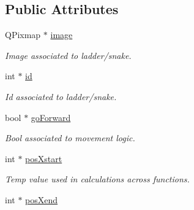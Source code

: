 \subsection*{Public Attributes}
\begin{DoxyCompactItemize}
\item 
\hypertarget{classgamescene__1__ladderSnake_a9f6d4f80e42294baf24e9f75595f2f36}{Q\-Pixmap $\ast$ \hyperlink{classgamescene__1__ladderSnake_a9f6d4f80e42294baf24e9f75595f2f36}{image}}\label{classgamescene__1__ladderSnake_a9f6d4f80e42294baf24e9f75595f2f36}

\begin{DoxyCompactList}\small\item\em Image associated to ladder/snake. \end{DoxyCompactList}\item 
\hypertarget{classgamescene__1__ladderSnake_a84c434594befd54905917da864b842f5}{int $\ast$ \hyperlink{classgamescene__1__ladderSnake_a84c434594befd54905917da864b842f5}{id}}\label{classgamescene__1__ladderSnake_a84c434594befd54905917da864b842f5}

\begin{DoxyCompactList}\small\item\em Id associated to ladder/snake. \end{DoxyCompactList}\item 
\hypertarget{classgamescene__1__ladderSnake_a4412cbb937c7acdb62f70fb1c348b315}{bool $\ast$ \hyperlink{classgamescene__1__ladderSnake_a4412cbb937c7acdb62f70fb1c348b315}{go\-Forward}}\label{classgamescene__1__ladderSnake_a4412cbb937c7acdb62f70fb1c348b315}

\begin{DoxyCompactList}\small\item\em Bool associated to movement logic. \end{DoxyCompactList}\item 
\hypertarget{classgamescene__1__ladderSnake_ad521dbf1e24a90ccb3e1d9ffca2cd110}{int $\ast$ \hyperlink{classgamescene__1__ladderSnake_ad521dbf1e24a90ccb3e1d9ffca2cd110}{pos\-Xstart}}\label{classgamescene__1__ladderSnake_ad521dbf1e24a90ccb3e1d9ffca2cd110}

\begin{DoxyCompactList}\small\item\em Temp value used in calculations across functions. \end{DoxyCompactList}\item 
\hypertarget{classgamescene__1__ladderSnake_a96d4e6756e756f79cb4eebfa24a4f6fb}{int $\ast$ \hyperlink{classgamescene__1__ladderSnake_a96d4e6756e756f79cb4eebfa24a4f6fb}{pos\-Xend}}\label{classgamescene__1__ladderSnake_a96d4e6756e756f79cb4eebfa24a4f6fb}


\end{DoxyCompactItemize}
